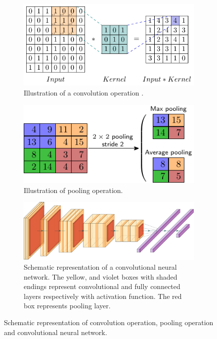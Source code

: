 \begin{figure}[htb!]
	\centering
	\begin{subfigure}[b]{0.8\textwidth}
		\centering
		\includegraphics[width=\textwidth,keepaspectratio]{images/background/conv2d.pdf}
		\caption{Illustration of a convolution operation \cite{Conv2D}.}
		\label{fig:conv2dillustration}
	\end{subfigure}
	\hfill
	\begin{subfigure}[b]{0.7\textwidth}
		\centering
		\includegraphics[width=\textwidth,keepaspectratio]{images/background/Pooling.pdf}
		\caption{Illustration of pooling operation.}
		\label{fig:poolingillustration}
	\end{subfigure}
	\hfill
	\begin{subfigure}[b]{\textwidth}
		\centering
		\includegraphics[width=\textwidth,keepaspectratio]{images/background/CNN-schematic.pdf}
		\caption{Schematic representation of a convolutional neural network. The yellow, and violet boxes with shaded endings represent convolutional and fully connected layers respectively with activation function. The red box represents pooling layer.}
		\label{fig:CNN-schematic}
	\end{subfigure}
	
	\caption{Schematic representation of convolution operation, pooling operation and convolutional neural network.}
	\label{fig:conv-CNN-schematic}
\end{figure}
